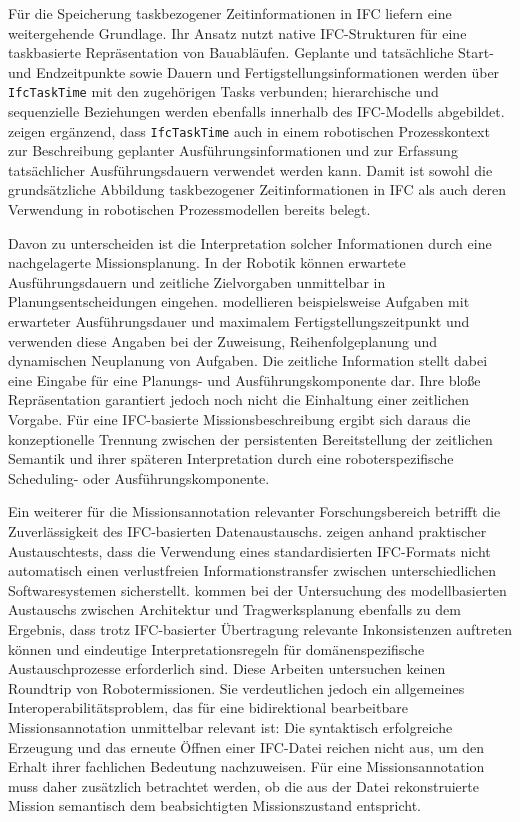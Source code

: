 Für die Speicherung taskbezogener Zeitinformationen in IFC liefern \textcite{sheik2023exchanging}
eine weitergehende Grundlage. Ihr Ansatz nutzt native IFC-Strukturen für eine taskbasierte
Repräsentation von Bauabläufen. Geplante und tatsächliche Start- und Endzeitpunkte sowie Dauern und
Fertigstellungsinformationen werden über \texttt{IfcTaskTime} mit den zugehörigen Tasks verbunden;
hierarchische und sequenzielle Beziehungen werden ebenfalls innerhalb des IFC-Modells abgebildet.
\textcite{slepicka2026fim} zeigen ergänzend, dass \texttt{IfcTaskTime} auch in einem robotischen
Prozesskontext zur Beschreibung geplanter Ausführungsinformationen und zur Erfassung tatsächlicher
Ausführungsdauern verwendet werden kann. Damit ist sowohl die grundsätzliche Abbildung taskbezogener
Zeitinformationen in IFC als auch deren Verwendung in robotischen Prozessmodellen bereits belegt.

Davon zu unterscheiden ist die Interpretation solcher Informationen durch eine nachgelagerte
Missionsplanung. In der Robotik können erwartete Ausführungsdauern und zeitliche Zielvorgaben
unmittelbar in Planungsentscheidungen eingehen. \textcite{calvo2025heterogeneous} modellieren
beispielsweise Aufgaben mit erwarteter Ausführungsdauer und maximalem Fertigstellungszeitpunkt und
verwenden diese Angaben bei der Zuweisung, Reihenfolgeplanung und dynamischen Neuplanung von
Aufgaben. Die zeitliche Information stellt dabei eine Eingabe für eine Planungs- und
Ausführungskomponente dar. Ihre bloße Repräsentation garantiert jedoch noch nicht die Einhaltung
einer zeitlichen Vorgabe. Für eine IFC-basierte Missionsbeschreibung ergibt sich daraus die
konzeptionelle Trennung zwischen der persistenten Bereitstellung der zeitlichen Semantik und ihrer
späteren Interpretation durch eine roboterspezifische Scheduling- oder Ausführungskomponente.

Ein weiterer für die Missionsannotation relevanter Forschungsbereich betrifft die Zuverlässigkeit
des IFC-basierten Datenaustauschs. \textcite{pazlar2008interoperability} zeigen anhand praktischer
Austauschtests, dass die Verwendung eines standardisierten IFC-Formats nicht automatisch einen
verlustfreien Informationstransfer zwischen unterschiedlichen Softwaresystemen sicherstellt.
\textcite{sibenik2020assessment} kommen bei der Untersuchung des modellbasierten Austauschs zwischen
Architektur und Tragwerksplanung ebenfalls zu dem Ergebnis, dass trotz IFC-basierter Übertragung
relevante Inkonsistenzen auftreten können und eindeutige Interpretationsregeln für
domänenspezifische Austauschprozesse erforderlich sind. Diese Arbeiten untersuchen keinen Roundtrip
von Robotermissionen. Sie verdeutlichen jedoch ein allgemeines Interoperabilitätsproblem, das für
eine bidirektional bearbeitbare Missionsannotation unmittelbar relevant ist: Die syntaktisch
erfolgreiche Erzeugung und das erneute Öffnen einer IFC-Datei reichen nicht aus, um den Erhalt ihrer
fachlichen Bedeutung nachzuweisen. Für eine Missionsannotation muss daher zusätzlich betrachtet
werden, ob die aus der Datei rekonstruierte Mission semantisch dem beabsichtigten Missionszustand
entspricht.

